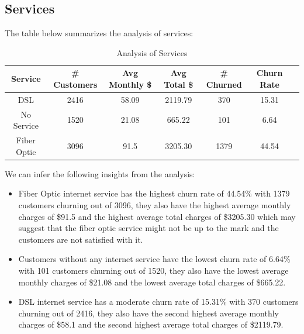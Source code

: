\documentclass{article}
\theoremstyle{mytheoremstyle}
\theoremstyle{mytheoremstyle}
\theoremstyle{myproblemstyle}
\begin{document}
\subsection{Services}
The table below summarizes the analysis of services:

\begin{table}[H]
    \centering
    \begin{tabular}{|c|c|c|c|c|c|c|}
        \hline
        \textbf{Service} & \textbf{\# Customers} & \textbf{Avg Monthly \$} & \textbf{Avg Total \$} & \textbf{\# Churned} & \textbf{Churn Rate} \\
        \hline
        DSL & 2416 & 58.09 & 2119.79 & 370 & 15.31 \\
        No Service & 1520 & 21.08 & 665.22 & 101 & 6.64 \\
        Fiber Optic & 3096 & 91.5 & 3205.30 & 1379 & 44.54 \\
        \hline
    \end{tabular}
    \caption{Analysis of Services}
\end{table}

We can infer the following insights from the analysis:

\begin{itemize}
    \item Fiber Optic internet service has the highest churn rate of 44.54\% with 1379 customers churning out of 3096, they also have the highest average monthly charges of \$91.5 and the highest average total charges of \$3205.30 which may suggest that the fiber optic service might not be up to the mark and the customers are not satisfied with it.
    \item Customers without any internet service have the lowest churn rate of 6.64\% with 101 customers churning out of 1520, they also have the lowest average monthly charges of \$21.08 and the lowest average total charges of \$665.22.
    \item DSL internet service has a moderate churn rate of 15.31\% with 370 customers churning out of 2416, they also have the second highest average monthly charges of \$58.1 and the second highest average total charges of \$2119.79.
\end{itemize}


\end{document}
